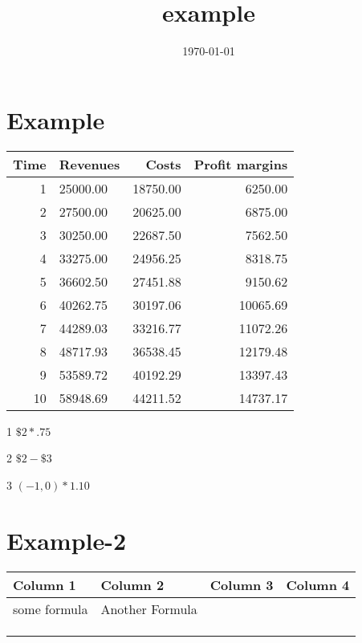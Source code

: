 \documentclass[11pt]{article}
\date{\today}
\title{example}
\begin{document}
\maketitle
\tableofcontents

\section{Example}
\label{sec-1}


\begin{table}
\centering
\begin{threeparttable}

\begin{center}
\begin{tabular}{rlrr}
Time & Revenues & Costs\tnote{1} & Profit margins\tnote{2}\\
\hline
1 & 25000.00 & 18750.00 & 6250.00\\
2 & 27500.00\tnote{3} & 20625.00 & 6875.00\\
3 & 30250.00\tnote{3} & 22687.50 & 7562.50\\
4 & 33275.00\tnote{3} & 24956.25 & 8318.75\\
5 & 36602.50\tnote{3} & 27451.88 & 9150.62\\
6 & 40262.75\tnote{3} & 30197.06 & 10065.69\\
7 & 44289.03\tnote{3} & 33216.77 & 11072.26\\
8 & 48717.93\tnote{3} & 36538.45 & 12179.48\\
9 & 53589.72\tnote{3} & 40192.29 & 13397.43\\
10 & 58948.69\tnote{3} & 44211.52 & 14737.17\\
\hline
\end{tabular}
\end{center}

\begin{tablenotes}
\item [1] \(\$2*.75\)
\item [2] \(\$2-\$3\)
\item [3] \((-1,0)*1.10\)
\end{tablenotes}

\end{threeparttable}
\end{table}

\section{Example-2}
\label{sec-2}

\begin{center}
\begin{tabular}{llll}
Column 1 & Column 2 & Column 3 & Column 4\\
\hline
some formula \footnotemark & Another Formula \footnotemark[1]{} &  & \\
 &  &  & \\
 &  &  & \\
 &  &  & \\
\end{tabular}
\end{center}
\end{document}
